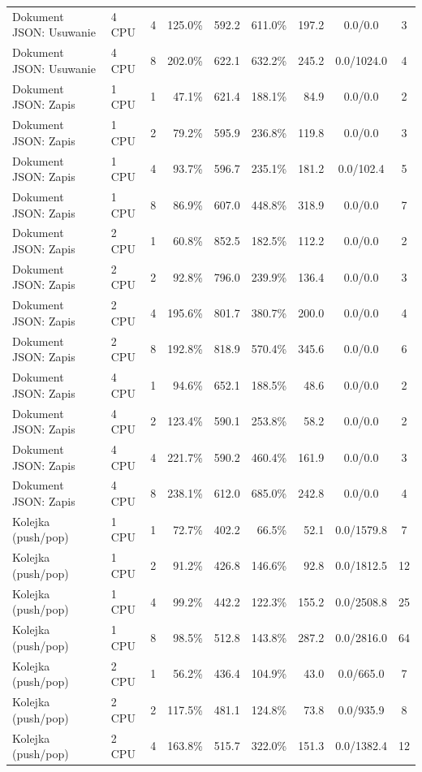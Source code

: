 \begin{table}[ht]
{\begin{tabular}{llcrrrrcc}
Dokument JSON: Usuwanie & 4 CPU & 4 & 125.0\% & 592.2 & 611.0\% & 197.2 & 0.0/0.0 & 3 \\
Dokument JSON: Usuwanie & 4 CPU & 8 & 202.0\% & 622.1 & 632.2\% & 245.2 & 0.0/1024.0 & 4 \\
Dokument JSON: Zapis & 1 CPU & 1 & 47.1\% & 621.4 & 188.1\% & 84.9 & 0.0/0.0 & 2 \\
Dokument JSON: Zapis & 1 CPU & 2 & 79.2\% & 595.9 & 236.8\% & 119.8 & 0.0/0.0 & 3 \\
Dokument JSON: Zapis & 1 CPU & 4 & 93.7\% & 596.7 & 235.1\% & 181.2 & 0.0/102.4 & 5 \\
Dokument JSON: Zapis & 1 CPU & 8 & 86.9\% & 607.0 & 448.8\% & 318.9 & 0.0/0.0 & 7 \\
Dokument JSON: Zapis & 2 CPU & 1 & 60.8\% & 852.5 & 182.5\% & 112.2 & 0.0/0.0 & 2 \\
Dokument JSON: Zapis & 2 CPU & 2 & 92.8\% & 796.0 & 239.9\% & 136.4 & 0.0/0.0 & 3 \\
Dokument JSON: Zapis & 2 CPU & 4 & 195.6\% & 801.7 & 380.7\% & 200.0 & 0.0/0.0 & 4 \\
Dokument JSON: Zapis & 2 CPU & 8 & 192.8\% & 818.9 & 570.4\% & 345.6 & 0.0/0.0 & 6 \\
Dokument JSON: Zapis & 4 CPU & 1 & 94.6\% & 652.1 & 188.5\% & 48.6 & 0.0/0.0 & 2 \\
Dokument JSON: Zapis & 4 CPU & 2 & 123.4\% & 590.1 & 253.8\% & 58.2 & 0.0/0.0 & 2 \\
Dokument JSON: Zapis & 4 CPU & 4 & 221.7\% & 590.2 & 460.4\% & 161.9 & 0.0/0.0 & 3 \\
Dokument JSON: Zapis & 4 CPU & 8 & 238.1\% & 612.0 & 685.0\% & 242.8 & 0.0/0.0 & 4 \\
Kolejka (push/pop) & 1 CPU & 1 & 72.7\% & 402.2 & 66.5\% & 52.1 & 0.0/1579.8 & 7 \\
Kolejka (push/pop) & 1 CPU & 2 & 91.2\% & 426.8 & 146.6\% & 92.8 & 0.0/1812.5 & 12 \\
Kolejka (push/pop) & 1 CPU & 4 & 99.2\% & 442.2 & 122.3\% & 155.2 & 0.0/2508.8 & 25 \\
Kolejka (push/pop) & 1 CPU & 8 & 98.5\% & 512.8 & 143.8\% & 287.2 & 0.0/2816.0 & 64 \\
Kolejka (push/pop) & 2 CPU & 1 & 56.2\% & 436.4 & 104.9\% & 43.0 & 0.0/665.0 & 7 \\
Kolejka (push/pop) & 2 CPU & 2 & 117.5\% & 481.1 & 124.8\% & 73.8 & 0.0/935.9 & 8 \\
Kolejka (push/pop) & 2 CPU & 4 & 163.8\% & 515.7 & 322.0\% & 151.3 & 0.0/1382.4 & 12 \\

\end{tabular}}
\end{table}
